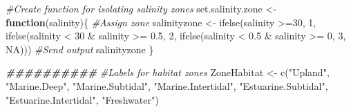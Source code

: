 \documentclass[
]{book}
\newenvironment{Shaded}{\begin{snugshade}}{\end{snugshade}}
\newcommand{\CommentTok}[1]{\textcolor[rgb]{0.56,0.35,0.01}{\textit{#1}}}
\newcommand{\ConstantTok}[1]{\textcolor[rgb]{0.00,0.00,0.00}{#1}}
\newcommand{\ControlFlowTok}[1]{\textcolor[rgb]{0.13,0.29,0.53}{\textbf{#1}}}
\newcommand{\DecValTok}[1]{\textcolor[rgb]{0.00,0.00,0.81}{#1}}
\newcommand{\DocumentationTok}[1]{\textcolor[rgb]{0.56,0.35,0.01}{\textbf{\textit{#1}}}}
\newcommand{\FloatTok}[1]{\textcolor[rgb]{0.00,0.00,0.81}{#1}}
\newcommand{\FunctionTok}[1]{\textcolor[rgb]{0.00,0.00,0.00}{#1}}
\newcommand{\NormalTok}[1]{#1}
\newcommand{\OtherTok}[1]{\textcolor[rgb]{0.56,0.35,0.01}{#1}}
\newcommand{\SpecialCharTok}[1]{\textcolor[rgb]{0.00,0.00,0.00}{#1}}
\newcommand{\StringTok}[1]{\textcolor[rgb]{0.31,0.60,0.02}{#1}}
\begin{document}
\begin{Shaded}
\begin{Highlighting}[]
\CommentTok{\#Create function for isolating salinity zones}
\NormalTok{set.salinity.zone }\OtherTok{\textless{}{-}} \ControlFlowTok{function}\NormalTok{(salinity)\{}
  \CommentTok{\#Assign zone}
\NormalTok{  salinityzone }\OtherTok{\textless{}{-}} \FunctionTok{ifelse}\NormalTok{(salinity }\SpecialCharTok{\textgreater{}=}\DecValTok{30}\NormalTok{, }\DecValTok{1}\NormalTok{, }
                  \FunctionTok{ifelse}\NormalTok{(salinity }\SpecialCharTok{\textless{}} \DecValTok{30} \SpecialCharTok{\&}\NormalTok{ salinity }\SpecialCharTok{\textgreater{}=} \FloatTok{0.5}\NormalTok{, }\DecValTok{2}\NormalTok{, }
                  \FunctionTok{ifelse}\NormalTok{(salinity }\SpecialCharTok{\textless{}} \FloatTok{0.5} \SpecialCharTok{\&}\NormalTok{ salinity }\SpecialCharTok{\textgreater{}=} \DecValTok{0}\NormalTok{, }\DecValTok{3}\NormalTok{, }\ConstantTok{NA}\NormalTok{)))}
  \CommentTok{\#Send output}
\NormalTok{  salinityzone}
\NormalTok{\}}

\DocumentationTok{\#\#\#\#\#\#\#\#\#\#}
\CommentTok{\#Labels for habitat zones}
\NormalTok{ZoneHabitat }\OtherTok{\textless{}{-}} \FunctionTok{c}\NormalTok{(}\StringTok{"Upland"}\NormalTok{, }\StringTok{"Marine.Deep"}\NormalTok{, }\StringTok{"Marine.Subtidal"}\NormalTok{, }\StringTok{"Marine.Intertidal"}\NormalTok{, }\StringTok{"Estuarine.Subtidal"}\NormalTok{, }\StringTok{"Estuarine.Intertidal"}\NormalTok{, }\StringTok{"Freshwater"}\NormalTok{)}


\end{Highlighting}
\end{Shaded}
\end{document}

